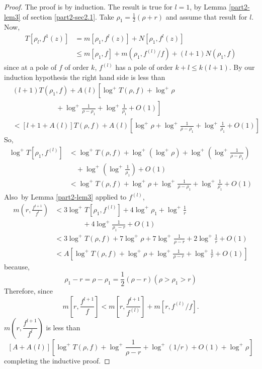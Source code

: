 \begin{proof}
The proof is by induction. The result is true for $l=1$, by Lemma
\ref{part2-lem3} of section \ref{part2-sec2.1}. Take
$\rho_{1}=\frac{1}{2}(\rho+r)$ and assume that result for $l$. Now,
\begin{align*}
T[\rho_{l},f^{1}(z)] &= m[\rho_{1},f^{l}(z)]+N[\rho_{1},f^{l}(z)]\\
&\leq m[\rho_{1},f]+m(\rho_{1},f^{(l)}/f)+(l+1)N(\rho_{1},f) 
\end{align*}
since at a pole of $f$ of order $k$, $f^{(l)}$ has a pole of order
$k+l\leq k(l+1)$. By our induction hypothesis the right hand side is
less than
\begin{align*}
&(l+1)T(\rho_{1},f)+A(l)\left[\log^{+}T(\rho,f)+\log^{+}\rho\phantom{\frac{1}{\rho-\rho_{1}}}\right.\\
&\qquad\qquad\qquad\left.{\,}+\log^{+}\frac{1}{\rho-\rho_{1}}+\log^{+}\frac{1}{\rho_{1}}
    + O(1)\right]\\
&< [l+1+A(l)]T(\rho,f)+A(l)\left[\log^{+}\rho+\log^{+}\frac{1}{\rho-\rho_{1}}+\log^{+}\frac{1}{\rho_{1}}+O(1)\right]
\end{align*}
So,
\begin{align*}
\log^{+}T[\rho_{1},f^{(l)}] &<
\log^{+}T(\rho,f)+\log^{+}(\log^{+}\rho)+\log^{+}\left(\log^{+}\frac{1}{\rho-\rho_{1}}\right)\\
&\quad +\log^{+}\left(\log^{+}\frac{1}{\rho_{1}}\right)+O(1)\\
&<
\log^{+}T(\rho,f)+\log^{+}\rho+\log^{+}\frac{1}{\rho-\rho_{1}}+\log^{+}\frac{1}{\rho_{1}}+O(1) 
\end{align*}
Also\pageoriginale\ by Lemma \ref{part2-lem3} applied to $f^{(l)}$,
\begin{align*}
m\left(r,\frac{f^{l+1}}{f^{l}}\right) &<
3\log^{+}T\left[\rho_{1},f^{(l)}\right]+4\log^{+}\rho_{1}+\log^{+}\frac{1}{r}\\
&\qquad\qquad+4\log^{+}\frac{1}{\rho_{1}-r}+O(1)\\
&<
3\log^{+}T(\rho,f)+7\log^{+}\rho+7\log^{+}\frac{1}{\rho-r}+2\log^{+}\frac{1}{r}+O(1)\\  
&<
A\left[\log^{+}T(\rho,f)+\log^{+}\rho+\log^{+}\frac{1}{\rho-r}+\log^{+}\frac{1}{r}+O(1)\right] 
\end{align*}
because,
$$
\rho_{1}-r=\rho-\rho_{1}=\frac{1}{2}(\rho-r) (\rho>\rho_{1}>r)
$$
Therefore, since
$$
m\left[r,\frac{f^{l+1}}{f}\right]<m\left[r,\frac{f^{l+1}}{f^{(l)}}\right]+m\left[r,f^{(l)}/f\right]. 
$$
$m\left(r,\dfrac{f^{l+1}}{f^{l}}\right)$ is less than
$$
[A+A(l)]\left[\log^{+}T(\rho,f)+\log^{+}\frac{1}{\rho-r} +
  \log^{+}(1/r)+O(1)+\log^{+}\rho\right]  
$$
completing the inductive proof.
\end{proof}

